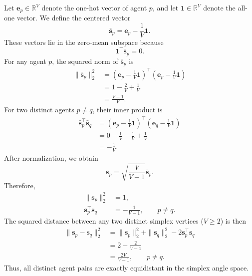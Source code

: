 \documentclass{llmxive}
\begin{document}
Let $\mathbf{e}_p\in\mathbb{R}^{V}$ denote the one-hot vector of agent $p$, and let $\mathbf{1}\in\mathbb{R}^{V}$ denote the all-one vector. 
We define the centered vector
\begin{equation}
\bar{\mathbf{s}}_p
=
\mathbf{e}_p-\frac{1}{V}\mathbf{1}.
\end{equation}
These vectors lie in the zero-mean subspace because
\begin{equation}
\mathbf{1}^{\top}\bar{\mathbf{s}}_p=0.
\end{equation}
For any agent $p$, the squared norm of $\bar{\mathbf{s}}_p$ is
\begin{align}
\|\bar{\mathbf{s}}_p\|_2^2
&=
\left(
\mathbf{e}_p-\frac{1}{V}\mathbf{1}
\right)^{\top}
\left(
\mathbf{e}_p-\frac{1}{V}\mathbf{1}
\right) \\
&=
1-\frac{2}{V}+\frac{1}{V} \\
&=
\frac{V-1}{V}.
\end{align}
For two distinct agents $p\neq q$, their inner product is
\begin{align}
\bar{\mathbf{s}}_p^{\top}\bar{\mathbf{s}}_q
&=
\left(
\mathbf{e}_p-\frac{1}{V}\mathbf{1}
\right)^{\top}
\left(
\mathbf{e}_q-\frac{1}{V}\mathbf{1}
\right) \\
&=
0-\frac{1}{V}-\frac{1}{V}+\frac{1}{V} \\
&=
-\frac{1}{V}.
\end{align}
After normalization, we obtain
\begin{equation}
\mathbf{s}_p
=
\sqrt{\frac{V}{V-1}}
\bar{\mathbf{s}}_p.
\end{equation}
Therefore,
\begin{align}
\|\mathbf{s}_p\|_2^2 &= 1, \\
\mathbf{s}_p^{\top}\mathbf{s}_q
&=
-\frac{1}{V-1},
\qquad p\neq q.
\end{align}
The squared distance between any two distinct simplex vertices ($V\geq 2 $) is then
\begin{align}
\|\mathbf{s}_p-\mathbf{s}_q\|_2^2
&=
\|\mathbf{s}_p\|_2^2
+
\|\mathbf{s}_q\|_2^2
-
2\mathbf{s}_p^{\top}\mathbf{s}_q \\
&=
2+\frac{2}{V-1} \\
&=
\frac{2V}{V-1},
\qquad p\neq q.
\end{align}
Thus, all distinct agent pairs are exactly equidistant in the simplex angle space.
\end{document}
